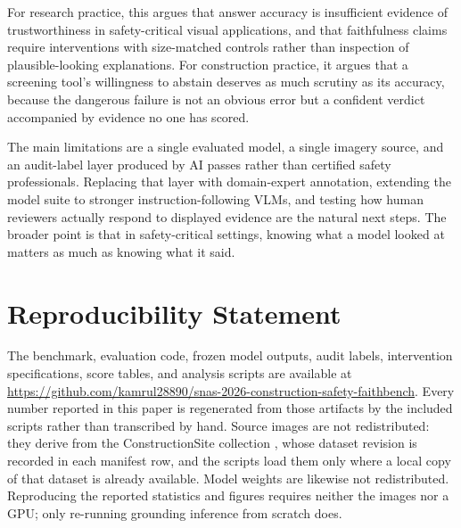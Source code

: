 \documentclass[conference]{IEEEtran}
\begin{document}
For research practice, this argues that answer accuracy is insufficient evidence of trustworthiness in safety-critical visual applications, and that faithfulness claims require interventions with size-matched controls rather than inspection of plausible-looking explanations. For construction practice, it argues that a screening tool's willingness to abstain deserves as much scrutiny as its accuracy, because the dangerous failure is not an obvious error but a confident verdict accompanied by evidence no one has scored.

The main limitations are a single evaluated model, a single imagery source, and an audit-label layer produced by AI passes rather than certified safety professionals. Replacing that layer with domain-expert annotation, extending the model suite to stronger instruction-following VLMs, and testing how human reviewers actually respond to displayed evidence are the natural next steps. The broader point is that in safety-critical settings, knowing what a model looked at matters as much as knowing what it said.

\section*{Reproducibility Statement}

The benchmark, evaluation code, frozen model outputs, audit labels, intervention
specifications, score tables, and analysis scripts are available at
\url{https://github.com/kamrul28890/snas-2026-construction-safety-faithbench}.
Every number reported in this paper is regenerated from those artifacts by the
included scripts rather than transcribed by hand. Source images are not
redistributed: they derive from the ConstructionSite collection \cite{chen2025}, whose dataset revision is recorded in each manifest row, and the scripts
load them only where a local copy of that dataset is already available. Model
weights are likewise not redistributed. Reproducing the reported statistics and
figures requires neither the images nor a GPU; only re-running grounding
inference from scratch does.
\end{document}

